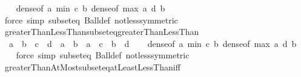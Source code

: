 \begin{isabellebody}
%
\isadelimproof
\ \ %
\endisadelimproof
%
\isatagproof
{}\isamarkupfalse%
\ dense{\isacharbrackleft}{\kern0pt}of\ {\isachardoublequoteopen}a{\isachardoublequoteclose}\ {\isachardoublequoteopen}min\ c\ b{\isachardoublequoteclose}{\isacharbrackright}{\kern0pt}\ dense{\isacharbrackleft}{\kern0pt}of\ {\isachardoublequoteopen}max\ a\ d{\isachardoublequoteclose}\ {\isachardoublequoteopen}b{\isachardoublequoteclose}{\isacharbrackright}{\kern0pt}\isanewline
\ \ \isamarkupfalse%
\ {\isacharparenleft}{\kern0pt}force\ simp{\isacharcolon}{\kern0pt}\ subset{\isacharunderscore}{\kern0pt}eq\ Ball{\isacharunderscore}{\kern0pt}def\ not{\isacharunderscore}{\kern0pt}less{\isacharbrackleft}{\kern0pt}symmetric{\isacharbrackright}{\kern0pt}{\isacharparenright}{\kern0pt}%
\endisatagproof
{\isafoldproof}%
%
\isadelimproof
\isanewline
%
\endisadelimproof
\isanewline
{}\isamarkupfalse%
\ greaterThanLessThan{\isacharunderscore}{\kern0pt}subseteq{\isacharunderscore}{\kern0pt}greaterThanLessThan{\isacharcolon}{\kern0pt}\isanewline
\ \ {\isachardoublequoteopen}{\isacharbraceleft}{\kern0pt}a\ {\isacharless}{\kern0pt}{\isachardot}{\kern0pt}{\isachardot}{\kern0pt}{\isacharless}{\kern0pt}\ b{\isacharbraceright}{\kern0pt}\ {\isasymsubseteq}\ {\isacharbraceleft}{\kern0pt}c\ {\isacharless}{\kern0pt}{\isachardot}{\kern0pt}{\isachardot}{\kern0pt}{\isacharless}{\kern0pt}\ d{\isacharbraceright}{\kern0pt}\ {\isasymlongleftrightarrow}\ {\isacharparenleft}{\kern0pt}a\ {\isacharless}{\kern0pt}\ b\ {\isasymlongrightarrow}\ a\ {\isasymge}\ c\ {\isasymand}\ b\ {\isasymle}\ d{\isacharparenright}{\kern0pt}{\isachardoublequoteclose}\isanewline
%
\isadelimproof
\ \ %
\endisadelimproof
%
\isatagproof
{}\isamarkupfalse%
\ dense{\isacharbrackleft}{\kern0pt}of\ {\isachardoublequoteopen}a{\isachardoublequoteclose}\ {\isachardoublequoteopen}min\ c\ b{\isachardoublequoteclose}{\isacharbrackright}{\kern0pt}\ dense{\isacharbrackleft}{\kern0pt}of\ {\isachardoublequoteopen}max\ a\ d{\isachardoublequoteclose}\ {\isachardoublequoteopen}b{\isachardoublequoteclose}{\isacharbrackright}{\kern0pt}\isanewline
\ \ \isamarkupfalse%
\ {\isacharparenleft}{\kern0pt}force\ simp{\isacharcolon}{\kern0pt}\ subset{\isacharunderscore}{\kern0pt}eq\ Ball{\isacharunderscore}{\kern0pt}def\ not{\isacharunderscore}{\kern0pt}less{\isacharbrackleft}{\kern0pt}symmetric{\isacharbrackright}{\kern0pt}{\isacharparenright}{\kern0pt}%
\endisatagproof
{\isafoldproof}%
%
\isadelimproof
\isanewline
%
\endisadelimproof
\isanewline
{}\isamarkupfalse%
\ greaterThanAtMost{\isacharunderscore}{\kern0pt}subseteq{\isacharunderscore}{\kern0pt}atLeastLessThan{\isacharunderscore}{\kern0pt}iff{\isacharcolon}{\kern0pt}\isanewline

\end{isabellebody}
